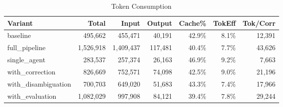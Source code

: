 \begin{table}[htbp]
\centering
\caption{Token Consumption}
\label{tab:tokens}
\begin{tabular}{l rrrr rr}
\toprule
Variant & Total & Input & Output & Cache\% & TokEff & Tok/Corr \\
\midrule
  baseline & 495,662 & 455,471 & 40,191 & 42.9\% & 8.1\% & 12,391 \\
  full\_pipeline & 1,526,918 & 1,409,437 & 117,481 & 40.4\% & 7.7\% & 43,626 \\
  single\_agent & 283,537 & 257,374 & 26,163 & 46.9\% & 9.2\% & 7,663 \\
  with\_correction & 826,669 & 752,571 & 74,098 & 42.5\% & 9.0\% & 21,196 \\
  with\_disambiguation & 700,703 & 649,020 & 51,683 & 43.3\% & 7.4\% & 17,966 \\
  with\_evaluation & 1,082,029 & 997,908 & 84,121 & 39.4\% & 7.8\% & 29,244 \\
\bottomrule
\end{tabular}
\end{table}
